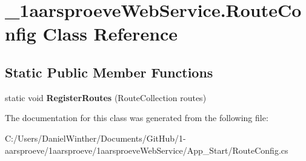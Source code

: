 \hypertarget{class__1aarsproeve_web_service_1_1_route_config}{}\section{\+\_\+1aarsproeve\+Web\+Service.\+Route\+Config Class Reference}
\label{class__1aarsproeve_web_service_1_1_route_config}
\subsection*{Static Public Member Functions}
\begin{DoxyCompactItemize}
\item 
\hypertarget{class__1aarsproeve_web_service_1_1_route_config_a2e7e1e761cec2f6d6ff22df4340a30d0}{}static void {\bfseries Register\+Routes} (Route\+Collection routes)\label{class__1aarsproeve_web_service_1_1_route_config_a2e7e1e761cec2f6d6ff22df4340a30d0}

\end{DoxyCompactItemize}


The documentation for this class was generated from the following file\+:\begin{DoxyCompactItemize}
\item 
C\+:/\+Users/\+Daniel\+Winther/\+Documents/\+Git\+Hub/1-\/aarsproeve/1aarsproeve/1aarsproeve\+Web\+Service/\+App\+\_\+\+Start/Route\+Config.\+cs\end{DoxyCompactItemize}
